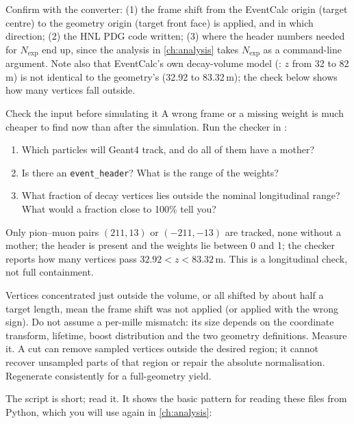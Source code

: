 \begin{organisernote}
Confirm with the converter: (1) the frame shift from the EventCalc origin
(target centre) to the geometry origin (target front face) is applied, and
in which direction; (2) the HNL PDG code written; (3) where the header numbers
needed for $N_\mathrm{exp}$ end up, since the analysis in \cref{ch:analysis}
takes $N_\mathrm{exp}$ as a command-line argument. Note also that
EventCalc's own decay-volume model (: $z$ from 32
to 82\,m) is not identical to the geometry's (32.92 to 83.32\,m); the check
below shows how many vertices fall outside.
\end{organisernote}

\begin{exercise}{Check the input before simulating it}
\label{ex:checkinput}
A wrong frame or a missing weight is much cheaper to find now than after the
simulation. Run the checker in :
\begin{enumerate}
  \item Which particles will Geant4 track, and do all of them have a mother?
  \item Is there an \texttt{event\_header}? What is the range of the weights?
  \item What fraction of decay vertices lies outside the nominal longitudinal range?
        What would a fraction close to 100\% tell you?
\end{enumerate}
\end{exercise}

\begin{checkpoint}
Only pion--muon pairs $(211,13)$ or $(-211,-13)$ are tracked, none without a mother; the header is
present and the weights lie between 0 and 1; the checker reports how many vertices pass
$32.92 < z < 83.32$\,m. This is a longitudinal check, not full containment.
\end{checkpoint}

\begin{solution}
Vertices concentrated just outside the volume, or all shifted by about half a
target length, mean the frame shift was not applied (or applied with the
wrong sign). Do not assume a per-mille mismatch: its size depends on the coordinate
transform, lifetime, boost distribution and the two geometry definitions.
Measure it. A cut can remove sampled vertices outside the desired region;
it cannot recover unsampled parts of that region or repair the absolute
normalisation. Regenerate consistently for a full-geometry yield.
\end{solution}

The script is short; read it. It shows the basic pattern for reading these
files from Python, which you will use again in \cref{ch:analysis}:

